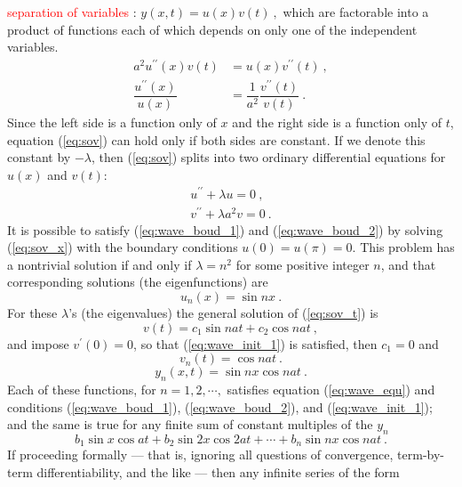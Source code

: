 \documentclass[12pt,a4paper]{article}
\begin{document}
\textcolor{red}{separation of variables} : $y(x,t) = u(x) v(t) ~,$ which are factorable into a product of functions each of which depends on only one of the independent variables.  
\begin{align}
\nonumber a^2 u^{\prime \prime}(x) v(t) &= u(x) v^{\prime \prime}(t) ~, \\
\dfrac{u^{\prime \prime}(x) }{u(x)} &= \dfrac{1}{a^2} \dfrac{v^{\prime \prime}(t)}{v(t)} ~.
\label{eq:sov}
\end{align}
Since the left side is a function only of $x$ and the right side is a function only of $t$, equation (\ref{eq:sov}) can hold only if both sides are constant. If we denote this constant by $-\lambda$, then (\ref{eq:sov}) splits into two ordinary differential equations for $u(x)$ and $v(t)$:
\begin{align}
u^{\prime \prime} +\lambda u = 0 ~, \label{eq:sov_x} \\
v^{\prime \prime} +\lambda a^2 v = 0 ~. \label{eq:sov_t}
\end{align}
It is possible to satisfy (\ref{eq:wave_boud_1}) and (\ref{eq:wave_boud_2}) by solving (\ref{eq:sov_x}) with the boundary conditions $u(0)=u(\pi)=0$. This problem has a nontrivial solution if and only if $\lambda= n^2$ for some positive integer $n$, and that corresponding solutions (the eigenfunctions) are 
\begin{equation}
u_n(x) = \sin nx ~.
\end{equation}
For these $\lambda$'s (the eigenvalues) the general solution of (\ref{eq:sov_t}) is
\begin{equation}
v(t) = c_1 \sin nat +c_2 \cos nat ~,
\end{equation}
and impose $v^\prime(0)=0$, so that (\ref{eq:wave_init_1}) is satisfied, then $c_1 =0$ and 
\begin{equation}
v_n(t) = \cos nat ~.
\end{equation}
\begin{equation*}
y_n(x,t) =\sin nx \cos nat ~.
\end{equation*}
Each of these functions, for $n = 1, 2, \cdots,$ satisfies equation (\ref{eq:wave_equ}) and conditions (\ref{eq:wave_boud_1}), (\ref{eq:wave_boud_2}), and (\ref{eq:wave_init_1}); and the same is true for any finite
sum of constant multiples of the $y_n$
\begin{equation}
b_1 \sin x \cos at +b_2 \sin 2x \cos 2at +\cdots +b_n \sin nx \cos nat ~.
\end{equation}
If proceeding formally --- that is, ignoring all questions of convergence, term-by-term differentiability, and the like --- then any infinite series of the form
\end{document}
